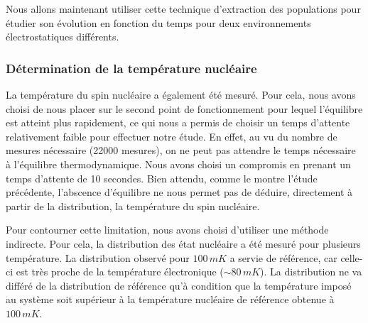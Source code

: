 Nous allons maintenant utiliser cette technique d'extraction des populations pour étudier son évolution en fonction du temps pour deux environnements électrostatiques différents.


\subsubsection{Détermination de la température nucléaire}
La température du spin nucléaire a également été mesuré. Pour cela, nous avons choisi de nous placer sur le second point de fonctionnement pour lequel l'équilibre est atteint plus rapidement, ce qui nous  a permis de choisir un temps d'attente relativement faible pour effectuer notre étude. En effet, au vu du nombre de mesures nécessaire (22000 mesures), on ne peut pas attendre le temps nécessaire à l'équilibre thermodynamique. Nous avons choisi un compromis en prenant un temps d'attente de 10 secondes. Bien attendu, comme le montre l'étude précédente, l'abscence d'équilibre ne nous permet pas de déduire, directement à partir de la distribution, la température du spin nucléaire.

Pour contourner cette limitation, nous avons choisi d'utiliser une méthode indirecte. Pour cela, la distribution des état nucléaire a été mesuré pour plusieurs température. La distribution observé pour $100\,mK$ a servie de référence, car celle-ci est très proche de la température électronique ($\sim 80\,mK$). La distribution ne va différé de la distribution de référence qu'à condition que la température imposé au système soit supérieur à la température nucléaire de référence obtenue à $100\,mK$.

